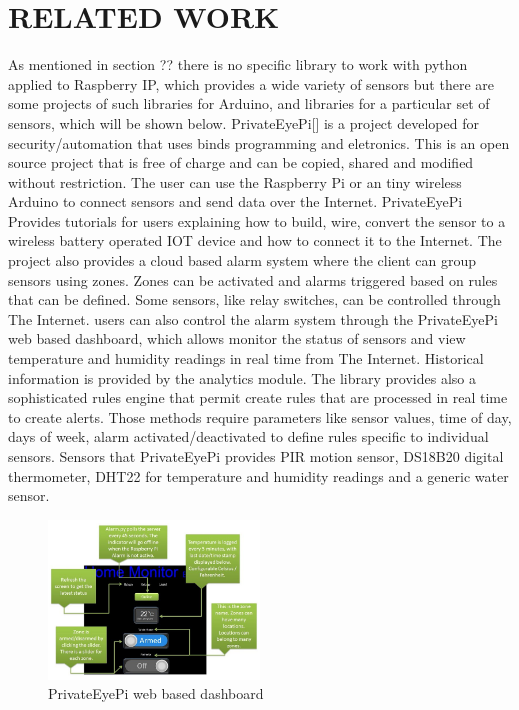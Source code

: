 \documentclass{acm_proc_article-sp}
\begin{document}
\section{RELATED WORK}
As mentioned in section ?? there is no specific library to work with python applied to Raspberry IP, which provides a wide variety of sensors but there are some projects of such libraries for Arduino, and libraries for a particular set of sensors, which will be shown below.
\newline
\newline
PrivateEyePi[] is a project developed for security/automation that uses binds programming and eletronics.%
This is an open source project that is free of charge and can be copied, shared and modified without restriction.
The user can use the Raspberry Pi or an tiny wireless Arduino to connect sensors and send data over the Internet.
\newline
\newline
PrivateEyePi Provides tutorials for users explaining how to build, wire, convert the sensor to a wireless battery operated IOT device and how to connect it to the Internet. The project also provides a cloud based alarm system where the client can group sensors using zones. Zones can be activated and alarms triggered based on rules that can be defined.
\newline
\newline
Some sensors, like relay switches, can be controlled through The Internet. users can also control the alarm system through the PrivateEyePi web based dashboard, which allows monitor the status of sensors and view temperature and humidity readings in real time from The Internet. Historical information is provided by the analytics module. The library provides also a sophisticated rules engine that permit create rules that are processed in real time to create alerts. Those methods require parameters like sensor values, time of day, days of week, alarm activated/deactivated to define rules specific to individual sensors.     
Sensors that PrivateEyePi provides PIR motion sensor, DS18B20 digital thermometer, DHT22 for temperature and humidity readings and a generic water sensor.
\begin{figure}[h]
    \includegraphics[width=0.5\textwidth,natwidth=610,natheight=642]{pictures/dashboardPrivateeye.png}
    \caption{PrivateEyePi web based dashboard}
\end{figure}
\end{document}
